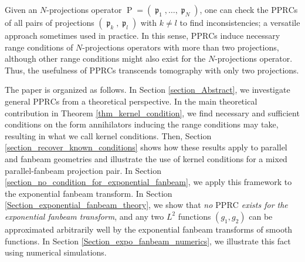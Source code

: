 \documentclass[12pt]{article}
\DeclareMathOperator{\Projind}{\mathfrak{p}}
\DeclareMathOperator{\Projbasic}{P}
\newcommand{\conditionname}{$\mathrm{PPRC}$}
\begin{document}
Given an $N$-projections operator $\Projbasic=(\Projind_1,\dots,\Projind_N)$, one can check the \conditionname s  of all pairs of projections $(\Projind_k,\Projind_l)$ with $k\neq l$ to find inconsistencies; a versatile approach sometimes used in practice.  In this sense, \conditionname s  induce necessary range conditions of $N$-projections operators with more than two projections, although other range conditions might also exist for the $N$-projections operator. 
Thus, the usefulness of \conditionname s transcends tomography with only two projections. 











The paper is organized as follows.
In Section \ref{section_Abstract}, we investigate general
 \conditionname s from a theoretical perspective. In the main theoretical contribution in Theorem \ref{thm_kernel_condition}, we find necessary and sufficient conditions on the form annihilators inducing the range conditions may take, resulting in what we call kernel conditions. Then, Section \ref{section_recover_known_conditions} shows how these results apply to parallel and fanbeam geometries and illustrate the use of kernel conditions for a mixed parallel-fanbeam projection pair. In Section \ref{section_no_condition_for_exponential_fanbeam}, we apply this framework to the exponential fanbeam transform. In Section \ref{Section_exponential_fanbeam_theory}, we show that {\em no \conditionname{} exists for the exponential fanbeam transform}, and any two $L^2$ functions $(g_1,g_2)$ can be approximated arbitrarily well by the exponential fanbeam transforms of smooth functions. In Section \ref{Section_expo_fanbeam_numerics}, we illustrate this fact using numerical simulations.
\end{document}
